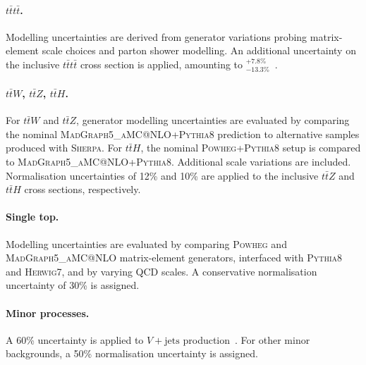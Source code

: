 \paragraph{\textbf{\boldmath $t\bar{t}t\bar{t}$.}}

Modelling uncertainties are derived from generator variations probing matrix-element scale choices and parton shower modelling.
An additional uncertainty on the inclusive $t\bar{t}t\bar{t}$ cross section is applied, amounting to $^{+7.8\%}_{-13.3\%}$~\cite{vanBeekveld:2022hty}.

\paragraph{\textbf{\boldmath $t\bar{t}W$, $t\bar{t}Z$, $t\bar{t}H$.}}

For $t\bar{t}W$ and $t\bar{t}Z$, generator modelling uncertainties are evaluated by comparing the nominal \textsc{MadGraph5\_aMC@NLO}+\textsc{Pythia8} prediction to alternative samples produced with \textsc{Sherpa}.
For $t\bar{t}H$, the nominal \textsc{Powheg}+\textsc{Pythia8} setup is compared to \textsc{MadGraph5\_aMC@NLO}+\textsc{Pythia8}.
Additional scale variations are included.
Normalisation uncertainties of 12\% and 10\% are applied to the inclusive $t\bar{t}Z$ and $t\bar{t}H$ cross sections, respectively.

\paragraph{\textbf{\boldmath Single top.}}

Modelling uncertainties are evaluated by comparing \textsc{Powheg} and \textsc{MadGraph5\allowbreak\_aMC@NLO} matrix-element generators, interfaced with \textsc{Pythia8} and \textsc{Herwig7}, and by varying QCD scales.
A conservative normalisation uncertainty of 30\% is assigned.

\paragraph{\textbf{\boldmath Minor processes.}}

A 60\% uncertainty is applied to $V+\mathrm{jets}$ production~\cite{Alwall:2007fs}.
For other minor backgrounds, a 50\% normalisation uncertainty is assigned.
